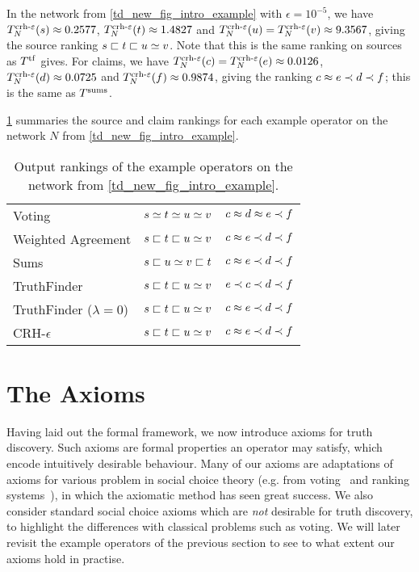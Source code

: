 In the network from \cref{td_new_fig_intro_example} with $\epsilon = 10^{-5}$,
we have $T^{\operatorname{crh-{\varepsilon}}}_N(s) \approx 0.2577$, $T^{\operatorname{crh-{\varepsilon}}}_N(t) \approx
1.4827$ and $T^{\operatorname{crh-{\varepsilon}}}_N(u) = T^{\operatorname{crh-{\varepsilon}}}_N(v) \approx 9.3567$, giving
the source ranking $s \sqsubset t \sqsubset u \simeq v$.  Note that this is the same
ranking on sources as $T^{\operatorname{tf}}$ gives. For claims, we have
$T^{\operatorname{crh-{\varepsilon}}}_N(c) = T^{\operatorname{crh-{\varepsilon}}}_N(e) \approx 0.0126$,
$T^{\operatorname{crh-{\varepsilon}}}_N(d) \approx 0.0725$ and $T^{\operatorname{crh-{\varepsilon}}}_N(f) \approx 0.9874$,
giving the ranking $c \approx e \prec d \prec f$; this is the same as $T^{\operatorname{sums}}$.

\cref{td_new_tab_example_outputs} summaries the source and claim rankings for
each example operator on the network $N$ from \cref{td_new_fig_intro_example}.

\begin{table}
    \centering
	\caption{Output rankings of the example operators on the network from
    \cref{td_new_fig_intro_example}.}
	\begin{tabular}{lcc}
    \toprule
    Voting             & $s \simeq t \simeq u \simeq v$ & $c \approx d \approx e \prec f$ \\
    Weighted Agreement & $s \sqsubset t \sqsubset u \simeq v$ & $c \approx e \prec d \prec f$ \\
    Sums               & $s \sqsubset u \simeq v \sqsubset t$ & $c \approx e \prec d \prec f$ \\
    TruthFinder        & $s \sqsubset t \sqsubset u \simeq v$ & $e \prec c \prec d \prec f$ \\
    TruthFinder ($\lambda = 0$) & $s \sqsubset t \sqsubset u \simeq v$ & $c \approx e \prec d \prec f$ \\
    CRH-$\epsilon$     & $s \sqsubset t \sqsubset u \simeq v$ & $c \approx e \prec d \prec f$ \\
    \bottomrule
	\end{tabular}
    \label{td_new_tab_example_outputs}
\end{table}

\section{The Axioms}
\label{td_new_sec_axioms}

Having laid out the formal framework, we now introduce axioms for truth
discovery. Such axioms are formal properties an operator may satisfy, which
encode intuitively desirable behaviour. Many of our axioms are adaptations of
axioms for various problem in social choice theory (e.g. from
voting~\cite{zwicker2016voting} and ranking systems~\cite{altman2008}), in
which the axiomatic method has seen great success. We also consider standard
social choice axioms which are \emph{not} desirable for truth discovery, to
highlight the differences with classical problems such as voting. We will later
revisit the example operators of the previous section to see to what extent our
axioms hold in practise.

